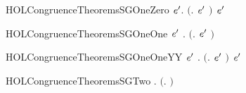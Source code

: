 \newcommand{\HOLCongruenceTheoremsSGOne}{\UseVerbatim{HOLCongruenceTheoremsSGOne}}
\begin{SaveVerbatim}{HOLCongruenceTheoremsSGOneZero}
\HOLTokenTurnstile{} \HOLSymConst{\HOLTokenForall{}} \ensuremath{\HOLBoundVar{e}\sp{\prime}}.  \ensuremath{(}\HOLTokenLambda{}. \HOLConst{\ensuremath{\tau}}\HOLSymConst{\ensuremath{\ldotp}}  \HOLSymConst{\ensuremath{+}} \HOLConst{\ensuremath{\tau}}\HOLSymConst{\ensuremath{\ldotp}}\ensuremath{\HOLBoundVar{e}\sp{\prime}} \ensuremath{)} \HOLSymConst{\HOLTokenImp{}}   \HOLSymConst{\HOLTokenConj{}}  \ensuremath{\HOLBoundVar{e}\sp{\prime}}
\end{SaveVerbatim}
\newcommand{\HOLCongruenceTheoremsSGOneZero}{\UseVerbatim{HOLCongruenceTheoremsSGOneZero}}
\begin{SaveVerbatim}{HOLCongruenceTheoremsSGOneOne}
\HOLTokenTurnstile{} \HOLSymConst{\HOLTokenForall{}} \ensuremath{\HOLBoundVar{e}\sp{\prime}} .  \ensuremath{(}\HOLTokenLambda{}. \HOLConst{\ensuremath{\tau}}\HOLSymConst{\ensuremath{\ldotp}}  \HOLSymConst{\ensuremath{+}}  \HOLSymConst{\ensuremath{\ldotp}}\ensuremath{\HOLBoundVar{e}\sp{\prime}} \ensuremath{)} \HOLSymConst{\HOLTokenImp{}}  
\end{SaveVerbatim}
\newcommand{\HOLCongruenceTheoremsSGOneOne}{\UseVerbatim{HOLCongruenceTheoremsSGOneOne}}
\begin{SaveVerbatim}{HOLCongruenceTheoremsSGOneOneYY}
\HOLTokenTurnstile{} \HOLSymConst{\HOLTokenForall{}} \ensuremath{\HOLBoundVar{e}\sp{\prime}} .  \ensuremath{(}\HOLTokenLambda{}.  \HOLSymConst{\ensuremath{\ldotp}}  \HOLSymConst{\ensuremath{+}} \HOLConst{\ensuremath{\tau}}\HOLSymConst{\ensuremath{\ldotp}}\ensuremath{\HOLBoundVar{e}\sp{\prime}} \ensuremath{)} \HOLSymConst{\HOLTokenImp{}}  \ensuremath{\HOLBoundVar{e}\sp{\prime}}
\end{SaveVerbatim}
\newcommand{\HOLCongruenceTheoremsSGOneOneYY}{\UseVerbatim{HOLCongruenceTheoremsSGOneOneYY}}
\begin{SaveVerbatim}{HOLCongruenceTheoremsSGTwo}
\HOLTokenTurnstile{} \HOLSymConst{\HOLTokenForall{}} .   \HOLSymConst{\HOLTokenImp{}}  \ensuremath{(}\HOLTokenLambda{}.  \HOLSymConst{\ensuremath{\ldotp}} \ensuremath{)}
\end{SaveVerbatim}
